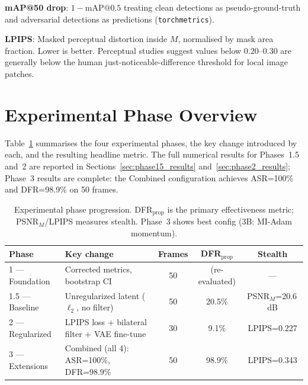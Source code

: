 \documentclass[12pt,a4paper]{report}
\begin{document}
\textbf{mAP@50 drop}: $1 - \text{mAP@0.5}$ treating clean detections as pseudo-ground-truth
and adversarial detections as predictions (\texttt{torchmetrics}).

\textbf{LPIPS}: Masked perceptual distortion \cite{zhang2018unreasonable} inside $M$, normalised by
mask area fraction. Lower is better. Perceptual studies suggest values below $0.20$--$0.30$
are generally below the human just-noticeable-difference threshold for local image patches.



\section{Experimental Phase Overview}
\label{sec:phase_overview}

Table~\ref{tab:phase_summary} summarises the four experimental phases,
the key change introduced by each, and the resulting headline metric.
The full numerical results for Phases~1.5 and~2 are reported in
Sections~\ref{sec:phase15_results} and~\ref{sec:phase2_results};
Phase~3 results are complete: the Combined configuration achieves ASR=100\% and DFR=98.9\% on 50 frames.

\begin{table}[htbp]
  \centering
  \caption{Experimental phase progression. DFR$_{\text{prop}}$ is the
           primary effectiveness metric; PSNR$_M$/LPIPS measures stealth.
           Phase~3 shows best config (3B: MI-Adam momentum).}
  \label{tab:phase_summary}
  \footnotesize
  \begin{tabular}{@{}l p{4.5cm} c c c@{}}
    \toprule
    \textbf{Phase} & \textbf{Key change} & \textbf{Frames} & \textbf{DFR$_{\text{prop}}$} & \textbf{Stealth} \\
    \midrule
    1 — Foundation   & Corrected metrics, bootstrap CI                        & 50 & (re-evaluated) & — \\
    1.5 — Baseline   & Unregularized latent ($\ell_2$, no filter)             & 50 & 20.5\%         & PSNR$_M$=20.6\,dB \\
    2 — Regularized  & LPIPS loss + bilateral filter + VAE fine-tune          & 30 & 9.1\%          & LPIPS=0.227 \\
    3 — Extensions   & Combined (all 4): ASR=100\%, DFR=98.9\%             & 50 & 98.9\%         & LPIPS=0.343 \\
    \bottomrule
  \end{tabular}
\end{table}
\end{document}
